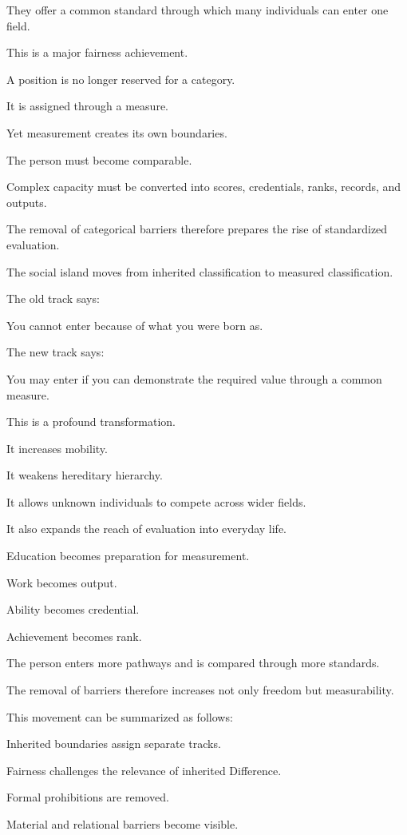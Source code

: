They offer a common standard through which many individuals can enter one field.

This is a major fairness achievement.

A position is no longer reserved for a category.

It is assigned through a measure.

Yet measurement creates its own boundaries.

The person must become comparable.

Complex capacity must be converted into scores, credentials, ranks, records, and outputs.

The removal of categorical barriers therefore prepares the rise of standardized evaluation.

The social island moves from inherited classification to measured classification.

The old track says:

You cannot enter because of what you were born as.

The new track says:

You may enter if you can demonstrate the required value through a common measure.

This is a profound transformation.

It increases mobility.

It weakens hereditary hierarchy.

It allows unknown individuals to compete across wider fields.

It also expands the reach of evaluation into everyday life.

Education becomes preparation for measurement.

Work becomes output.

Ability becomes credential.

Achievement becomes rank.

The person enters more pathways and is compared through more standards.

The removal of barriers therefore increases not only freedom but measurability.

This movement can be summarized as follows:

Inherited boundaries assign separate tracks.

Fairness challenges the relevance of inherited Difference.

Formal prohibitions are removed.

Material and relational barriers become visible.

